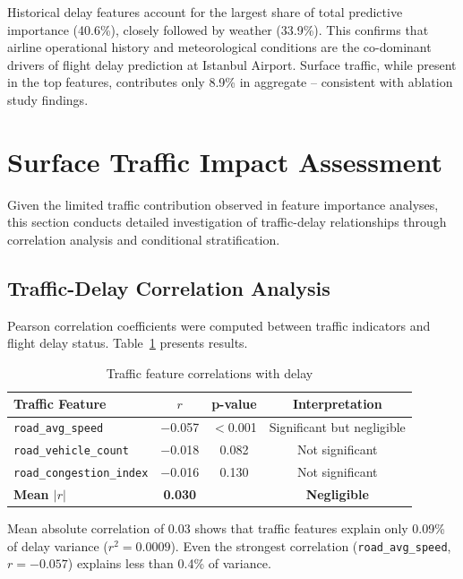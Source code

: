 \documentclass{report}
\begin{document}
Historical delay features account for the largest share of total predictive
importance (40.6\%), closely followed by weather (33.9\%).  This confirms
that airline operational history and meteorological conditions are the
co-dominant drivers of flight delay prediction at Istanbul Airport.  Surface
traffic, while present in the top features, contributes only 8.9\% in
aggregate -- consistent with ablation study findings.

\section{Surface Traffic Impact Assessment}
\label{sec:traffic}

Given the limited traffic contribution observed in feature importance
analyses, this section conducts detailed investigation of traffic-delay
relationships through correlation analysis and conditional stratification.

\subsection{Traffic-Delay Correlation Analysis}

Pearson correlation coefficients were computed between traffic indicators
and flight delay status.  Table~\ref{tab:traffic_corr} presents results.

\begin{table}[H]
\centering
\caption{Traffic feature correlations with delay}
\label{tab:traffic_corr}
\begin{tabular}{lccc}
\toprule
\textbf{Traffic Feature} & $r$ & \textbf{p-value} &
  \textbf{Interpretation} \\
\midrule
\texttt{road\_avg\_speed}        & $-$0.057 & $<$0.001 &
  Significant but negligible \\
\texttt{road\_vehicle\_count}    & $-$0.018 & 0.082 & Not significant \\
\texttt{road\_congestion\_index} & $-$0.016 & 0.130 & Not significant \\
\textbf{Mean $|r|$}              & \textbf{0.030} & &
  \textbf{Negligible} \\
\bottomrule
\end{tabular}
\end{table}

Mean absolute correlation of 0.03 shows that traffic features explain only
0.09\% of delay variance ($r^2 = 0.0009$).  Even the strongest correlation
(\texttt{road\_avg\_speed}, $r = -0.057$) explains less than 0.4\% of
variance.
\end{document}
